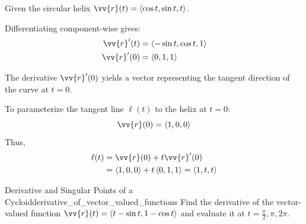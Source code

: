 \begin{example}
Given the circular helix $\vv{r}(t) = \ang{\cos t, \sin t, t}$.

Differentiating component-wise gives:
\begin{align*}
\vv{r}'(t) &= \ang{-\sin t, \cos t, 1} \\
\vv{r}'(0) &= \ang{0, 1, 1}
\end{align*}

The derivative $\vv{r}'(0)$ yields a vector representing the tangent direction of the curve at $t = 0$.

\begin{center}
\end{center}

To parameterize the tangent line $\ell(t)$ to the helix at $t = 0$:
\[
\vv{r}(0) = \ang{1, 0, 0}
\]
Thus,
\begin{align*}
\ell(t) &= \vv{r}(0) + t\vv{r}'(0) \\
&= \ang{1, 0, 0} + t\ang{0, 1, 1} = \ang{1, t, t}
\end{align*}
\end{example}

\begin{problem}{Derivative and Singular Points of a Cycloid}{derivative_of_vector_valued_functions}
Find the derivative of the vector-valued function $\vv{r}(t) = \ang{t - \sin t, 1 - \cos t}$ and evaluate it at $t = \frac{\pi}{2}, \pi, 2\pi$.
\end{problem}

